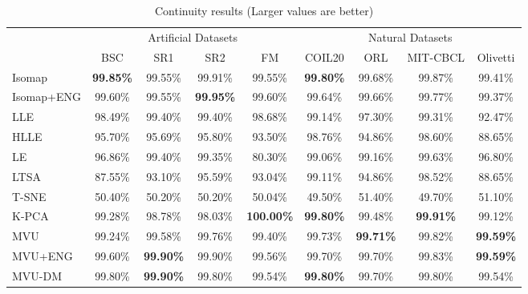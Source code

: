 \begin{table}[t]
\caption{Continuity results (Larger values are better)}
\label{tab:continuity}
\begin{center}
\begin{tabular}{|l|c|c|c|c||c|c|c|c|}
\hline
\multicolumn{1}{|c|}{} & \multicolumn{4}{c||}{Artificial Datasets} & \multicolumn{4}{c|}{Natural Datasets} \\
                     & BSC & SR1 & SR2 & FM & COIL20 & ORL & MIT-CBCL & Olivetti \\
\hline
Isomap            & \textbf{99.85\%} & 99.55\% & 99.91\% & 99.55\% & \textbf{99.80\%} & 99.68\% & 99.87\% & 99.41\% \\
Isomap+ENG            & 99.60\% & 99.55\% & \textbf{99.95\%} & 99.60\% & 99.64\% & 99.66\% & 99.77\% & 99.37\% \\
LLE            & 98.49\% & 99.40\% & 99.40\% & 98.68\% & 99.14\% & 97.30\% & 99.31\% & 92.47\% \\
HLLE            & 95.70\% & 95.69\% & 95.80\% & 93.50\% & 98.76\% & 94.86\% & 98.60\% & 88.65\% \\
LE            & 96.86\% & 99.40\% & 99.35\% & 80.30\% & 99.06\% & 99.16\% & 99.63\% & 96.80\% \\
LTSA            & 87.55\% & 93.10\% & 95.59\% & 93.04\% & 99.11\% & 94.86\% & 98.52\% & 88.65\% \\
T-SNE            & 50.40\% & 50.20\% & 50.20\% & 50.04\% & 49.50\% & 51.40\% & 49.70\% & 51.10\% \\
K-PCA            & 99.28\% & 98.78\% & 98.03\% & \textbf{100.00\%} & \textbf{99.80\%} & 99.48\% & \textbf{99.91\%} & 99.12\% \\
\hline
MVU            & 99.24\% & 99.58\% & 99.76\% & 99.40\% & 99.73\% & \textbf{99.71\%} & 99.82\% & \textbf{99.59\%} \\
MVU+ENG            & 99.60\% & \textbf{99.90\%} & 99.90\% & 99.56\% & 99.70\% & 99.70\% & 99.83\% & \textbf{99.59\%} \\
MVU-DM            & 99.80\% & \textbf{99.90\%} & 99.80\% & 99.54\% & \textbf{99.80\%} & 99.70\% & 99.80\% & 99.54\% \\
\hline
\end{tabular}
\end{center}
\end{table}
